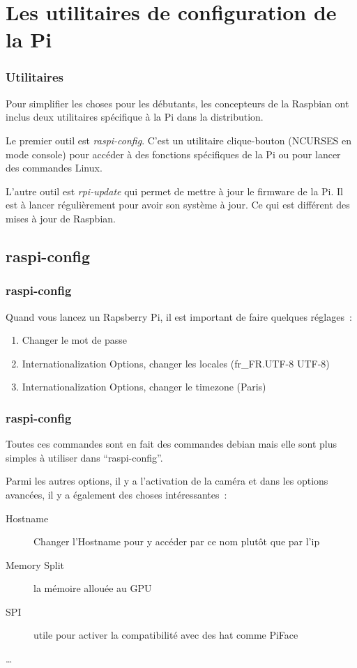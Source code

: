 \section{Les utilitaires de configuration de la Pi}



\begin{frame}[containsverbatim]
\frametitle{Utilitaires}
Pour simplifier les choses pour les débutants, les concepteurs de la Raspbian ont inclus deux utilitaires spécifique à la Pi dans la distribution.

Le premier outil est \emph{raspi-config}. C'est un utilitaire clique-bouton (NCURSES en mode console) pour accéder à des fonctions spécifiques de la Pi ou pour lancer des commandes Linux.

L'autre outil est \emph{rpi-update} qui permet de mettre à jour le firmware de la Pi. Il est à lancer régulièrement pour avoir son système à jour. Ce qui est différent des mises à jour de Raspbian.

\end{frame}

\subsection{raspi-config}

\begin{frame}[containsverbatim]
\frametitle{raspi-config}

Quand vous lancez un Rapsberry Pi, il est important de faire quelques réglages~:
\begin{enumerate}
	\item Changer le mot de passe
	\item Internationalization Options, changer les locales (fr\_FR.UTF-8 UTF-8)
	\item Internationalization Options, changer le timezone (Paris)
\end{enumerate}

\end{frame}

\begin{frame}[containsverbatim]
\frametitle{raspi-config}

Toutes ces commandes sont en fait des commandes debian mais elle sont plus simples à utiliser dans ``raspi-config''.

Parmi les autres options, il y a l'activation de la caméra et dans les options avancées, il y a également des choses intéressantes~:
\begin{description}
	\item[Hostname] Changer l'Hostname pour y accéder par ce nom plutôt que par l'ip
	\item[Memory Split] la mémoire allouée au GPU
	\item[SPI] utile pour activer la compatibilité avec des hat comme PiFace
	\item[\dots]
\end{description}
\end{frame}


